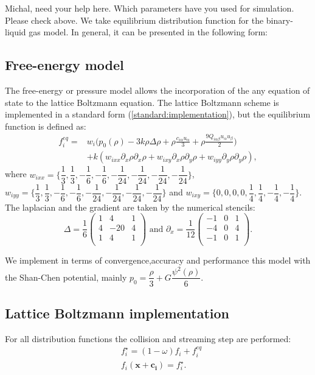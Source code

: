 \documentclass[mathpazo]{cicp}
\begin{document}
{\color{red} Michal, need your help here. Which parameters have you used for simulation. Please check above.}
We take equilibrium distribution function for the binary-liquid gas model. In general, it can be presented in the following form:
\subsection{Free-energy model}
The free-energy or pressure model \cite{swift} allows the incorporation of the any equation of state to the lattice Boltzmann equation. The lattice Boltzmann scheme is implemented in a standard form (\ref{standard:implementation}), but the equilibrium function is defined as:
\begin{equation}
\begin{aligned}
f_i^{eq}=&w_i \biggl(p_0(\rho)-3 k\rho\Delta\rho+\rho \frac{c_{i\alpha}u_{\alpha}}{3}+\rho \frac{9 Q_{i\alpha\beta}u_{\alpha}u_{\beta}}{2}\biggr)\\
&+k (w_{ixx} \partial_x \rho \partial_x \rho + w_{ixy} \partial_x \rho \partial_y \rho + w_{iyy} \partial_y \rho \partial_y \rho),
\end{aligned}
\end{equation}
where $w_{ixx}=\{\dfrac{1}{3},\dfrac{1}{3},-\dfrac{1}{6},-\dfrac{1}{6},-\dfrac{1}{24},-\dfrac{1}{24},-\dfrac{1}{24},-\dfrac{1}{24}\}$, $w_{iyy}=\{\dfrac{1}{3},\dfrac{1}{3},-\dfrac{1}{6},-\dfrac{1}{6},-\dfrac{1}{24},-\dfrac{1}{24},-\dfrac{1}{24},-\dfrac{1}{24}\}$ and $w_{ixy}=\{0,0,0,0,\dfrac{1}{4},\dfrac{1}{4},-\dfrac{1}{4},-\dfrac{1}{4}\}$. The laplacian and the gradient are taken by the numerical stencils:
\begin{equation}
\Delta=\frac{1}{6}
\begin{pmatrix}
1&4&1\\
4&-20&4\\
1&4&1\\
\end{pmatrix}\text{ and }
\partial_x=\frac{1}{12}
\begin{pmatrix}
-1&0&1\\
-4&0&4\\
-1&0&1\\
\end{pmatrix}.
\end{equation}

We implement in terms of convergence,accuracy and performance this model with the Shan-Chen potential, mainly $p_0=\dfrac{\rho}{3}+G\dfrac{\psi^2(\rho)}{6}$.

\subsection{Lattice Boltzmann implementation}
For all distribution functions the collision and streaming step are performed:
\begin{equation*}
\begin{aligned}
&f_i^{\star}=(1-\omega)f_i+f_i^{eq}\\
&f_i(\bm{x}+\bm{c_i})=f_i^{\star}. 
\end{aligned}
\end{equation*}
\end{document}
